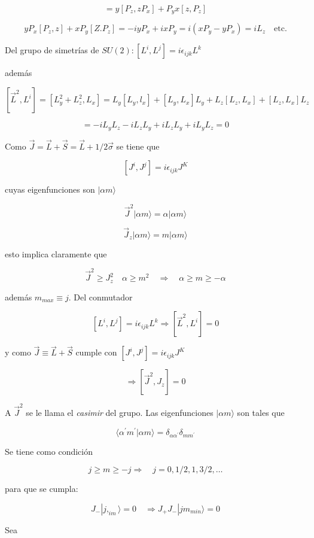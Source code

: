 \documentclass{report}
\begin{document}
\[= y[P_z, zP_x] + P_y x [z,P_z ]\]

\[yP_x [P_z , z] + x P_y [Z. P_z ] = -i yP_x + i xP_y = i (x P_y - y P_x) = iL_z \quad \text{etc.}\]

Del grupo de simetrías de $SU(2) : [L^i , L^j ] = i \epsilon_{ijk}L^{k}$

además

\[[\overrightarrow{L}^2 , L^i ] = [L_{y}^{2}+L_{z}^{2}, L_x ] = L_y [L_y , l_x ] + [L_y , L_x]L_y + L_z [L_z , L_x] + [L_z , L_ x] L_z\]

\[= -i L_yL_z -i L_z L_y +i L_z L_y + i L_y L_z = 0\]

Como $\overrightarrow{J} = \overrightarrow{L} + \overrightarrow{S} = \overrightarrow{L} + 1/2 \overrightarrow{\sigma}$ se tiene que

\[[J^i , J^j ] = i \epsilon_{ijk } J^K \]

cuyas eigenfunciones son $| \alpha m \rangle$

\[\overrightarrow{J}^2 |\alpha m \rangle = \alpha | \alpha m \rangle\]

\[\overrightarrow{J}_z |\alpha m \rangle = m | \alpha m \rangle\]

esto implica claramente que

\[\overrightarrow{J}^2 \geq J_{z}^2 \quad \alpha\geq m^2 \quad \Rightarrow \quad \alpha \geq m \geq -\alpha\]

además $m_{max} \equiv j$. Del conmutador

\[[L^i , L^j] = i \epsilon _{ijk} L^k \Rightarrow [\overrightarrow{L}^2 , L^i ] = 0\]

y como $\overrightarrow{J} \equiv \overrightarrow{L} + \overrightarrow{S}$ cumple con $[J^i , J^j ] = i \epsilon_{ijk} J^{K}$

\[ \Rightarrow [\overrightarrow{J}^2 , J_{z}] = 0\]

A $\overrightarrow{J}^2$ se le llama el \textit{casimir} del grupo. Las eigenfunciones $| \alpha m \rangle$ son tales que

\[\langle\alpha^{\prime}m^{\prime}|\alpha m \rangle = \delta_{\alpha \alpha^{\prime}} \delta_{m m^{\prime}}\]

Se tiene como condición

\[j \geq m \geq -j \Rightarrow \quad j = 0, 1/2,1,3/2, \dotsc \]

para que se cumpla:

\[J_{-}|j ,_{im}\rangle = 0 \quad \Rightarrow J_{+}J_{-}|jm_{min}\rangle = 0\]

Sea
\end{document}
